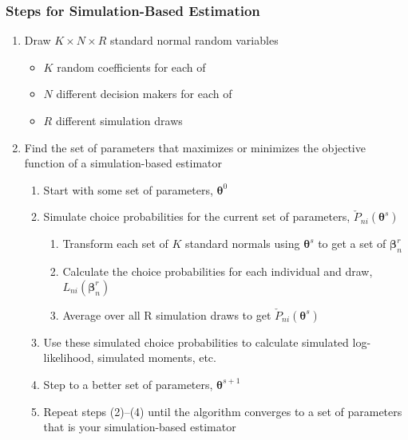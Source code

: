 \documentclass{beamer}\usepackage[]{graphicx}\usepackage[]{color}
\begin{document}
\begin{frame}\frametitle{Steps for Simulation-Based Estimation}
    \begin{enumerate}
        \item Draw $K \times N \times R$ standard normal random variables
        \begin{itemize}
            \item $K$ random coefficients for each of
            \item $N$ different decision makers for each of
            \item $R$ different simulation draws
        \end{itemize}
        \item Find the set of parameters that maximizes or minimizes the objective function of a simulation-based estimator
        \begin{enumerate}
            \item Start with some set of parameters, $\bm{\theta}^0$
            \item Simulate choice probabilities for the current set of parameters, $\check{P}_{ni}(\bm{\theta}^s)$
            \begin{enumerate}
                \item Transform each set of $K$ standard normals using $\bm{\theta}^s$ to get a set of $\bm{\beta}_n^r$
                \item Calculate the choice probabilities for each individual and draw, $L_{ni}(\bm{\beta}_n^r)$
                \item Average over all R simulation draws to get $\check{P}_{ni}(\bm{\theta}^s)$
            \end{enumerate}
            \item Use these simulated choice probabilities to calculate simulated log-likelihood, simulated moments, etc.
            \item Step to a better set of parameters, $\bm{\theta}^{s + 1}$
            \item Repeat steps (2)--(4) until the algorithm converges to a set of parameters that is your simulation-based estimator
        \end{enumerate}
    \end{enumerate}
\end{frame}
\end{document}
